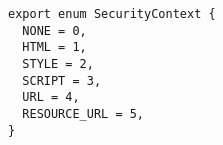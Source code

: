\begin{verbatim}
export enum SecurityContext {
  NONE = 0,
  HTML = 1,
  STYLE = 2,
  SCRIPT = 3,
  URL = 4,
  RESOURCE_URL = 5,
}
\end{verbatim}
